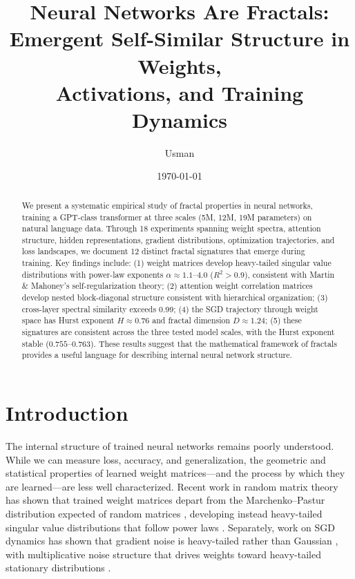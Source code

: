 \documentclass[11pt,a4paper]{article}
\title{\textbf{Neural Networks Are Fractals:}\\
Emergent Self-Similar Structure in Weights,\\Activations, and Training Dynamics}
\author{Usman}
\date{\today}
\begin{document}
\maketitle

\begin{abstract}
We present a systematic empirical study of fractal properties in neural networks, training a GPT-class transformer at three scales (5M, 12M, 19M parameters) on natural language data. Through 18 experiments spanning weight spectra, attention structure, hidden representations, gradient distributions, optimization trajectories, and loss landscapes, we document 12 distinct fractal signatures that emerge during training. Key findings include: (1) weight matrices develop heavy-tailed singular value distributions with power-law exponents $\alpha \approx 1.1$--$4.0$ ($R^2 > 0.9$), consistent with Martin \& Mahoney's self-regularization theory; (2) attention weight correlation matrices develop nested block-diagonal structure consistent with hierarchical organization; (3) cross-layer spectral similarity exceeds 0.99; (4) the SGD trajectory through weight space has Hurst exponent $H \approx 0.76$ and fractal dimension $D \approx 1.24$; (5) these signatures are consistent across the three tested model scales, with the Hurst exponent stable ($0.755$--$0.763$). These results suggest that the mathematical framework of fractals provides a useful language for describing internal neural network structure.
\end{abstract}

\section{Introduction}

The internal structure of trained neural networks remains poorly understood. While we can measure loss, accuracy, and generalization, the geometric and statistical properties of learned weight matrices---and the process by which they are learned---are less well characterized. Recent work in random matrix theory has shown that trained weight matrices depart from the Marchenko--Pastur distribution expected of random matrices \citep{marchenko1967distribution}, developing instead heavy-tailed singular value distributions that follow power laws \citep{martin2019implicit, martin2021predicting}. Separately, work on SGD dynamics has shown that gradient noise is heavy-tailed rather than Gaussian \citep{simsekli2019tail}, with multiplicative noise structure that drives weights toward heavy-tailed stationary distributions \citep{hodgkinson2021multiplicative}.
\end{document}

